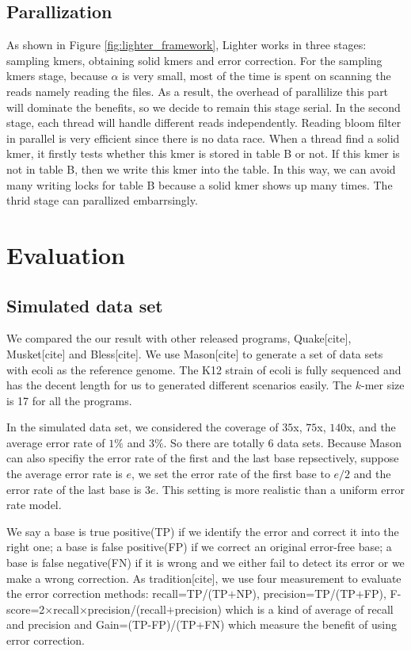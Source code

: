 \documentclass[10pt]{article}
\begin{document}
\subsection*{Parallization}
As shown in Figure \ref{fig:lighter_framework}, Lighter works in three stages: sampling kmers, obtaining solid kmers and error correction. For the sampling kmers stage, because $\alpha$ is very small, most of the time is spent on scanning the reads namely reading the files. As a result, the overhead of parallilize this part will dominate the benefits, so we decide to remain this stage serial. In the second stage, each thread will handle different reads independently. Reading bloom filter in parallel is very efficient since there is no data race. When a thread find a solid kmer, it firstly tests whether this kmer is stored in table B or not. If this kmer is not in table B, then we write this kmer into the table. In this way, we can avoid many writing locks for table B because a solid kmer shows up many times. The thrid stage can parallized embarrsingly.

\section*{Evaluation}
\subsection*{Simulated data set}
We compared the our result with other released programs, Quake[cite], Musket[cite] and Bless[cite]. We use Mason[cite] to generate a set of data sets with ecoli as the reference genome. The K12 strain of ecoli is fully sequenced and has the decent length for us to generated different scenarios easily. The $k$-mer size is 17 for all the programs.

In the simulated data set, we considered the coverage of $35$x, $75$x, $140$x, and the average error rate of $1\%$ and $3\%$. So there are totally 6 data sets. Because Mason can also specifiy the error rate of the first and the last base repsectively, suppose the average error rate is $e$, we set the error rate of the first base to $e/2$ and the error rate of the last base is $3e$. This setting is more realistic than a uniform error rate model. 

We say a base is true positive(TP) if we identify the error and correct it into the right one; a base is false positive(FP) if we correct an original error-free base; a base is false negative(FN) if it is wrong and we either fail to detect its error or we make a wrong correction. As tradition[cite], we use four measurement to evaluate the error correction methods: recall=TP/(TP$+$NP), precision=TP/(TP$+$FP), F-score=2$\times$recall$\times$precision/(recall$+$precision) which is a kind of average of recall and precision and Gain=(TP-FP)/(TP+FN) which measure the benefit of using error correction.
\end{document}
